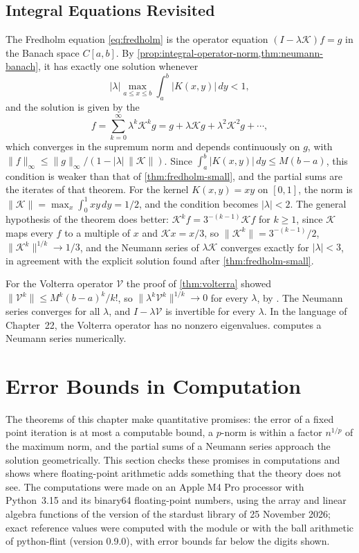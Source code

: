 \subsection{Integral Equations Revisited}

The Fredholm equation \eqref{eq:fredholm} is the operator equation $(I-\lambda\mathcal K)f=g$ in the Banach space $C[a,b]$. By \cref{prop:integral-operator-norm,thm:neumann-banach}, it has exactly one solution whenever
\[
|\lambda|\max_{a\le x\le b}\int_a^b|K(x,y)|\,dy<1 ,
\]
and the solution is given by the 
\[
f=\sum_{k=0}^\infty\lambda^k\mathcal K^kg=g+\lambda\mathcal Kg+\lambda^2\mathcal K^2g+\cdots ,
\]
which converges in the supremum norm and depends continuously on $g$, with $\|f\|_\infty\le\|g\|_\infty/(1-|\lambda|\,\|\mathcal K\|)$. Since $\int_a^b|K(x,y)|\,dy\le M(b-a)$, this condition is weaker than that of \cref{thm:fredholm-small}, and the partial sums are the iterates of that theorem. For the kernel $K(x,y)=xy$ on $[0,1]$, the norm is $\|\mathcal K\|=\max_x\int_0^1xy\,dy=1/2$, and the condition becomes $|\lambda|<2$. The general hypothesis of the theorem does better: $\mathcal K^kf=3^{-(k-1)}\mathcal Kf$ for $k\ge1$, since $\mathcal K$ maps every $f$ to a multiple of $x$ and $\mathcal Kx=x/3$, so $\|\mathcal K^k\|=3^{-(k-1)}/2$, $\|\mathcal K^k\|^{1/k}\to1/3$, and the Neumann series of $\lambda\mathcal K$ converges exactly for $|\lambda|<3$, in agreement with the explicit solution found after \cref{thm:fredholm-small}.

For the Volterra operator $\mathcal V$ the proof of \cref{thm:volterra} showed $\|\mathcal V^k\|\le M^k(b-a)^k/k!$, so $\|\lambda^k\mathcal V^k\|^{1/k}\to0$ for every $\lambda$, by . The Neumann series converges for all $\lambda$, and $I-\lambda\mathcal V$ is invertible for every $\lambda$. In the language of Chapter~22, the Volterra operator has no nonzero eigenvalues.  computes a Neumann series numerically.

\section{Error Bounds in Computation}
\label{sec:metric-computation}

The theorems of this chapter make quantitative promises: the error of a fixed point iteration is at most a computable bound, a $p$-norm is within a factor $n^{1/p}$ of the maximum norm, and the partial sums of a Neumann series approach the solution geometrically. This section checks these promises in computations and shows where floating-point arithmetic adds something that the theory does not see. The computations were made on an Apple M4 Pro processor with Python~3.15 and its binary64 floating-point numbers, using the array and linear algebra functions of the version of the stardust library of 25 November 2026; exact reference values were computed with the module  or with the ball arithmetic of python-flint (version 0.9.0), with error bounds far below the digits shown.

